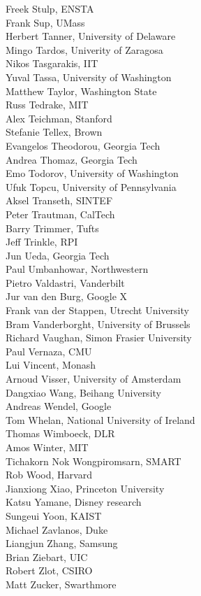 \begin{multicols}{3}
{Freek Stulp, ENSTA\\
Frank Sup, UMass\\
Herbert Tanner, University of Delaware\\
Mingo Tardos, Univerity of Zaragosa\\
Nikos Tasgarakis, IIT\\
Yuval Tassa, University of Washington\\
Matthew Taylor, Washington State\\
Russ Tedrake, MIT\\
Alex Teichman, Stanford\\
Stefanie Tellex, Brown\\
Evangelos Theodorou, Georgia Tech\\
Andrea Thomaz, Georgia Tech\\
Emo Todorov, University of Washington\\
Ufuk Topcu, University of Pennsylvania\\
Aksel Transeth, SINTEF\\
Peter Trautman, CalTech\\
Barry Trimmer, Tufts\\
Jeff Trinkle, RPI\\
Jun Ueda, Georgia Tech\\
Paul Umbanhowar, Northwestern\\
Pietro Valdastri, Vanderbilt\\
Jur van den Burg, Google X\\
Frank van der Stappen, Utrecht University\\
Bram Vanderborght, University of Brussels\\
Richard Vaughan, Simon Frasier University\\
Paul Vernaza, CMU\\
Lui Vincent, Monash\\
Arnoud Visser, University of Amsterdam\\
Dangxiao Wang, Beihang University\\
Andreas Wendel, Google\\
Tom Whelan, National University of Ireland\\
Thomas Wimboeck, DLR\\
Amos Winter, MIT\\
Tichakorn Nok Wongpiromsarn, SMART\\
Rob Wood, Harvard\\
Jianxiong Xiao, Princeton University\\
Katsu Yamane, Disney research\\
Sungeui Yoon, KAIST\\
Michael Zavlanos, Duke\\
Liangjun Zhang, Samsung\\
Brian Ziebart, UIC\\
Robert Zlot, CSIRO\\
Matt Zucker, Swarthmore\\
}
\end{multicols}
\vfill
